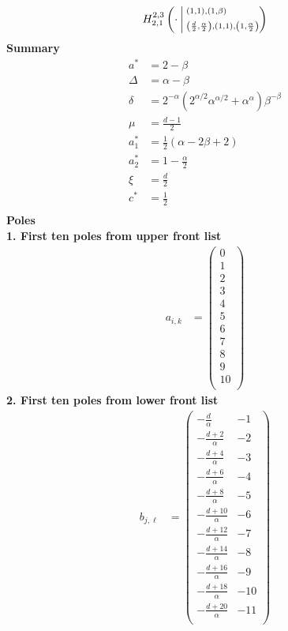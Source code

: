 \documentclass{article}
\newcommand{\FoxH}[5]{H_{#2}^{#1}\left(#3\:\middle\vert\: \begin{subarray}{l}#4\\[0.4em] #5\end{subarray}\right)}
\begin{document}
\begin{align*}
\FoxH{2,3}{2,1}{\cdot}{\left(1, 1\right), \left(1, \beta\right)}{\left(\frac{d}{2}, \frac{\alpha }{2}\right), \left(1, 1\right), \left(1, \frac{\alpha }{2}\right)}
\end{align*}
\noindent\textbf{Summary}
\begin{align*}
a^* &= 2-\beta \\
\Delta &= \alpha -\beta \\
\delta &= 2^{-\alpha } \left(2^{\alpha /2} \alpha ^{\alpha /2}+\alpha ^{\alpha }\right) \beta ^{-\beta } \\
\mu &= \frac{d-1}{2} \\
a_1^* &= \frac{1}{2} (\alpha -2 \beta +2) \\
a_2^* &= 1-\frac{\alpha }{2} \\
\xi &= \frac{d}{2} \\
c^* &= \frac{1}{2} \\
\end{align*}
\noindent\textbf{Poles}\\
\noindent\textbf{1. First ten poles from upper front list}
\begin{align*}
a_{i,k} &= \left(
\begin{array}{c}
 0 \\
 1 \\
 2 \\
 3 \\
 4 \\
 5 \\
 6 \\
 7 \\
 8 \\
 9 \\
 10 \\
\end{array}
\right)
\end{align*}
\noindent\textbf{2. First ten poles from lower front list}
\begin{align*}
b_{j,\ell} &= \left(
\begin{array}{cc}
 -\frac{d}{\alpha } & -1 \\
 -\frac{d+2}{\alpha } & -2 \\
 -\frac{d+4}{\alpha } & -3 \\
 -\frac{d+6}{\alpha } & -4 \\
 -\frac{d+8}{\alpha } & -5 \\
 -\frac{d+10}{\alpha } & -6 \\
 -\frac{d+12}{\alpha } & -7 \\
 -\frac{d+14}{\alpha } & -8 \\
 -\frac{d+16}{\alpha } & -9 \\
 -\frac{d+18}{\alpha } & -10 \\
 -\frac{d+20}{\alpha } & -11 \\
\end{array}
\right)
\end{align*}
\end{document}
